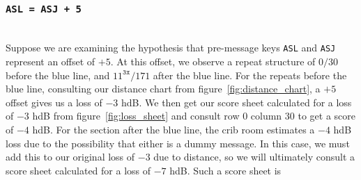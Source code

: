   \subsubsection{\texttt{ASL = ASJ + 5}}
  \text{}\\Suppose we are examining the hypothesis that pre-message
  keys \texttt{ASL} and \texttt{ASJ} represent an offset of $+5$. At
  this offset, we observe a repeat structure of $0/30$ before the
  blue line, and $11^\texttt{3x}/171$ after the blue line. For the
  repeats before the blue line, consulting our distance chart from
  figure~\ref{fig:distance_chart}, a $+5$ offset gives us a loss of
  $-3$ hdB. We then get our score sheet calculated for a loss of $-3$
  hdB from figure~\ref{fig:loss_sheet} and consult row $0$ column
  $30$ to get a score of $-4$ hdB. For the section after the blue
  line, the crib room estimates a $-4$ hdB loss due to the
  possibility that either is a dummy message. In this case, we must
  add this to our original loss of $-3$ due to distance, so we will
  ultimately consult a score sheet calculated for a loss of $-7$ hdB.
  Such a score sheet is
